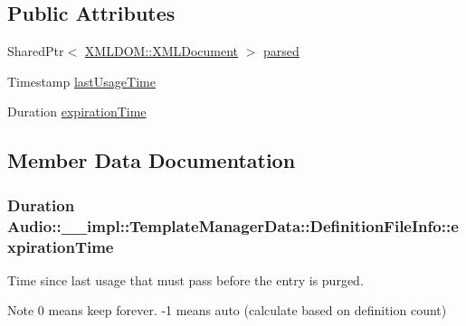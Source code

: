 \subsection*{Public Attributes}
\begin{DoxyCompactItemize}
\item 
Shared\+Ptr$<$ \hyperlink{classXMLDOM_1_1XMLDocument}{X\+M\+L\+D\+O\+M\+::\+X\+M\+L\+Document} $>$ \hyperlink{structAudio_1_1____impl_1_1TemplateManagerData_1_1DefinitionFileInfo_a63d30a8c972c159479ba7cffafd0dd64}{parsed}
\item 
Timestamp \hyperlink{structAudio_1_1____impl_1_1TemplateManagerData_1_1DefinitionFileInfo_a160cef86b17ce9ef5c5fd5ead1f44f23}{last\+Usage\+Time}
\item 
Duration \hyperlink{structAudio_1_1____impl_1_1TemplateManagerData_1_1DefinitionFileInfo_a3cb6d5f3b2087b25e198aa07f23b05dc}{expiration\+Time}
\end{DoxyCompactItemize}


\subsection{Member Data Documentation}
\subsubsection[{\texorpdfstring{expiration\+Time}{expirationTime}}]{\setlength{\rightskip}{0pt plus 5cm}Duration Audio\+::\+\_\+\+\_\+impl\+::\+Template\+Manager\+Data\+::\+Definition\+File\+Info\+::expiration\+Time}\hypertarget{structAudio_1_1____impl_1_1TemplateManagerData_1_1DefinitionFileInfo_a3cb6d5f3b2087b25e198aa07f23b05dc}{}\label{structAudio_1_1____impl_1_1TemplateManagerData_1_1DefinitionFileInfo_a3cb6d5f3b2087b25e198aa07f23b05dc}
Time since last usage that must pass before the entry is purged. \begin{DoxyNote}{Note}
0 means keep forever. -\/1 means auto (calculate based on definition count) 
\end{DoxyNote}
